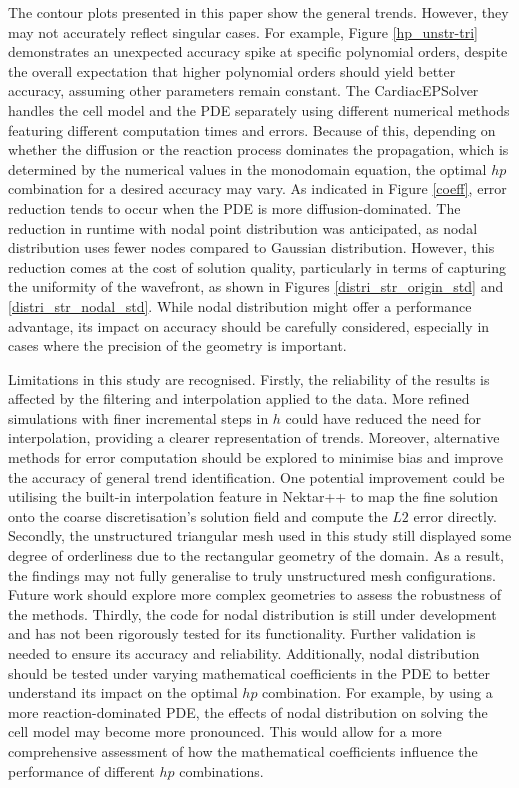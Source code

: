 The contour plots presented in this paper show the general trends. However, they may not accurately reflect singular cases. For example, Figure \ref{hp_unstr-tri} demonstrates an unexpected accuracy spike at specific polynomial orders, despite the overall expectation that higher polynomial orders should yield better accuracy, assuming other parameters remain constant. The CardiacEPSolver handles the cell model and the PDE separately using different numerical methods featuring different computation times and errors. Because of this, depending on whether the diffusion or the reaction process dominates the propagation, which is determined by the numerical values in the monodomain equation, the optimal $hp$ combination for a desired accuracy may vary. As indicated in Figure \ref{coeff}, error reduction tends to occur when the PDE is more diffusion-dominated. The reduction in runtime with nodal point distribution was anticipated, as nodal distribution uses fewer nodes compared to Gaussian distribution. However, this reduction comes at the cost of solution quality, particularly in terms of capturing the uniformity of the wavefront, as shown in Figures \ref{distri_str_origin_std} and \ref{distri_str_nodal_std}. While nodal distribution might offer a performance advantage, its impact on accuracy should be carefully considered, especially in cases where the precision of the geometry is important.
\par
Limitations in this study are recognised. Firstly, the reliability of the results is affected by the filtering and interpolation applied to the data. More refined simulations with finer incremental steps in $h$ could have reduced the need for interpolation, providing a clearer representation of trends. Moreover, alternative methods for error computation should be explored to minimise bias and improve the accuracy of general trend identification. One potential improvement could be utilising the built-in interpolation feature in Nektar++ to map the fine solution onto the coarse discretisation's solution field and compute the $L2$ error directly. Secondly, the unstructured triangular mesh used in this study still displayed some degree of orderliness due to the rectangular geometry of the domain. As a result, the findings may not fully generalise to truly unstructured mesh configurations. Future work should explore more complex geometries to assess the robustness of the methods. Thirdly, the code for nodal distribution is still under development and has not been rigorously tested for its functionality. Further validation is needed to ensure its accuracy and reliability. Additionally, nodal distribution should be tested under varying mathematical coefficients in the PDE to better understand its impact on the optimal $hp$ combination. For example, by using a more reaction-dominated PDE, the effects of nodal distribution on solving the cell model may become more pronounced. This would allow for a more comprehensive assessment of how the mathematical coefficients influence the performance of different $hp$ combinations.


